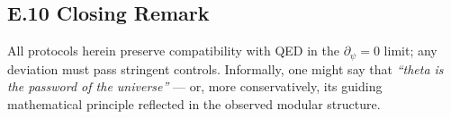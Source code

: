 \subsection*{E.10 Closing Remark}
All protocols herein preserve compatibility with QED in the $\partial_\psi\!=\!0$ limit; any deviation must pass stringent controls.
Informally, one might say that \emph{``theta is the password of the universe''} --- or, more conservatively, its guiding mathematical principle reflected in the observed modular structure.


